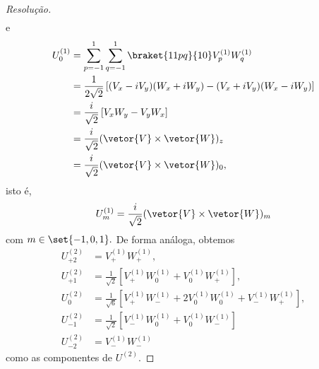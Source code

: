 \begin{proof}[Resolução]
\begin{align*}
   \end{align*}
   e
   \begin{align*}
      U^{(1)}_0 
      &=\sum_{p = -1}^1 \sum_{q = -1}^1 \braket{11pq}{10} V_p^{(1)} W_q^{(1)}\\
      &= \frac{1}{2\sqrt{2}} \left[(V_x - i V_y)(W_x + i W_y) - (V_x + i V_y)(W_x - i W_y)\right]\\
        &= \frac{i}{\sqrt{2}}\left[V_x W_y - V_y W_x\right]\\
        &= \frac{i}{\sqrt{2}} (\vetor{V}\times \vetor{W})_z\\
        &= \frac{i}{\sqrt{2}} (\vetor{V}\times \vetor{W})_0,
   \end{align*}
   isto é,
   \begin{equation*}
      U^{(1)}_m = \frac{i}{\sqrt{2}}(\vetor{V}\times \vetor{W})_m
   \end{equation*}
   com \(m \in \set{-1,0,1}.\) De forma análoga, obtemos 
   \begin{align*}
      U_{+2}^{(2)} &= V_+^{(1)}W_+^{(1)},\\
      U_{+1}^{(2)} &= \frac1{\sqrt{2}}\left[V_+^{(1)} W_0^{(1)} + V_0^{(1)} W_+^{(1)}\right],\\
      U_{0}^{(2)} &= \frac{1}{\sqrt{6}} \left[V_+^{(1)}W_-^{(1)} + 2 V_0^{(1)}W_0^{(1)} + V_-^{(1)}W_+^{(1)}\right],\\
      U_{-1}^{(2)} &= \frac1{\sqrt{2}}\left[V_-^{(1)} W_0^{(1)} + V_0^{(1)} W_-^{(1)}\right]\\
      U_{-2}^{(2)} &= V_-^{(1)}W_-^{(1)}
   \end{align*}
   como as componentes de \(U^{(2)}.\)


\end{proof}
